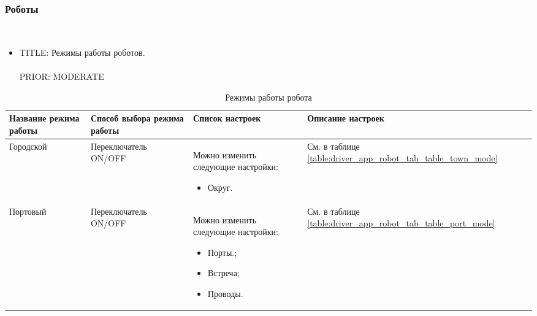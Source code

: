     \subsubsection{Роботы} \label{driver_app_robot_tab_robot_settings} \mbox{}\\

      \begin{itemize}

        \item{
          TITLE: Режимы работы роботов. \\
          \\
          PRIOR: MODERATE\\}
      \end{itemize}

      \begin{table}
          \begin{center}
          \caption {Режимы работы робота}
          \label{driver_app_robot_tab_modes}
          \setlength{\extrarowheight}{2mm}
          \begin{tabular}{|p{3cm}|p{3cm}|p{6cm}|p{3cm}|}

            \hline     \textbf{Название режима работы}&\textbf{Способ выбора режима работы}&\textbf{Список настроек}&\textbf{Описание настроек} \\ [2mm]

            \hline   Городской & Переключатель ON/OFF & Можно изменить следующие настройки: \begin{itemize} \item Округ. \end{itemize} & См. в таблице \ref{table:driver_app_robot_tab_table_town_mode} \\ [2mm]

            \hline   Портовый & Переключатель ON/OFF & Можно изменить следующие настройки: \begin{itemize} \item Порты.;  \item Встреча;  \item Проводы. \end{itemize} & См. в таблице \ref{table:driver_app_robot_tab_table_port_mode}  \\ [2mm]

            \hline
          \end{tabular}
          \end{center}
      \end{table}

